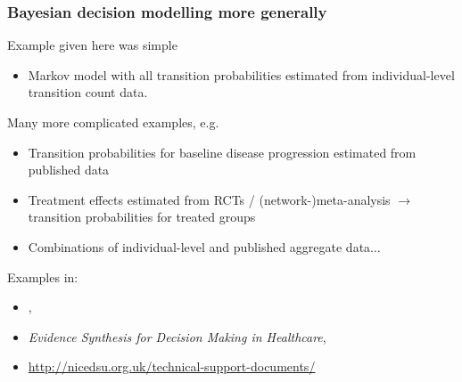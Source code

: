 \begin{frame}
  \frametitle{Bayesian decision modelling more generally}

  Example given here was simple
  \begin{itemize}
  \item Markov model with all transition probabilities estimated from
    individual-level transition count data.
  \end{itemize}

  Many more complicated examples, e.g. 

  \begin{itemize}

  \item Transition probabilities for baseline disease progression
    estimated from published data

  \item Treatment effects estimated from RCTs /
    (network-)meta-analysis $\rightarrow$ transition probabilities for
    treated groups

  \item Combinations of individual-level and published aggregate data$\ldots$

  \end{itemize}

  Examples in:
  \begin{itemize}
  \item   \bmhe,
  \item   \emph{Evidence Synthesis for Decision Making in Healthcare},
  \item   \url{http://nicedsu.org.uk/technical-support-documents/}
  \end{itemize}
 
\end{frame}


